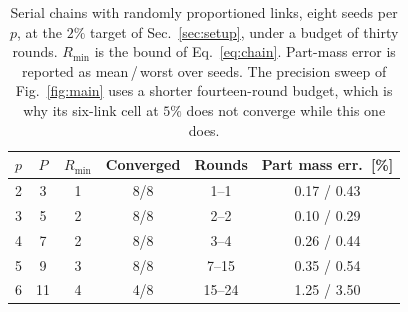\begin{table}[t]
\caption{Serial chains with randomly proportioned links, eight seeds per $p$,
at the $2\%$ target of Sec.~\ref{sec:setup}, under a budget of thirty rounds.
$R_{\min}$ is the bound of Eq.~\eqref{eq:chain}. Part-mass error is reported as
mean\,/\,worst over seeds. The precision sweep of
Fig.~\ref{fig:main} uses a shorter fourteen-round budget, which is
why its six-link cell at $5\%$ does not converge while this one does.}
\label{tab:scaling}
\centering
\scriptsize
\setlength{\tabcolsep}{4pt}
\begin{tabular}{cccccc}
\hline
$p$ & $P$ & $R_{\min}$ & Converged & Rounds & Part mass err.\ [\%] \\
\hline
2 &  3 & 1 & 8/8 & 1--1   & 0.17 / 0.43 \\
3 &  5 & 2 & 8/8 & 2--2   & 0.10 / 0.29 \\
4 &  7 & 2 & 8/8 & 3--4   & 0.26 / 0.44 \\
5 &  9 & 3 & 8/8 & 7--15  & 0.35 / 0.54 \\
6 & 11 & 4 & 4/8 & 15--24 & 1.25 / 3.50 \\
\hline
\end{tabular}
\end{table}